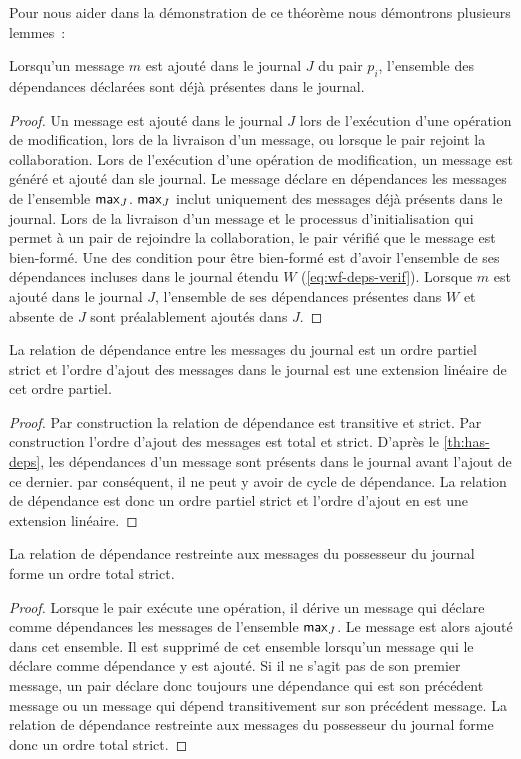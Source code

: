 Pour nous aider dans la démonstration de ce théorème nous démontrons plusieurs lemmes~:

\begin{lemma}\label{th:has-deps}
Lorsqu'un message $m$ est ajouté dans le journal $J$ du pair $p_i$, l'ensemble des dépendances déclarées sont déjà présentes dans le journal.
\end{lemma} 
\begin{proof}
Un message est ajouté dans le journal $J$ lors de l'exécution d'une opération de modification, lors de la livraison d'un message, ou lorsque le pair rejoint la collaboration.
Lors de l'exécution d'une opération de modification, un message est généré et ajouté dan sle journal.
Le message déclare en dépendances les messages de l'ensemble $\operatorname{\mathsf{max}}_J$.
$\operatorname{\mathsf{max}}_J$ inclut uniquement des messages déjà présents dans le journal.
Lors de la livraison d'un message et le processus d'initialisation qui permet à un pair de rejoindre la collaboration, le pair vérifié que le message est bien-formé.
Une des condition pour être bien-formé est d'avoir l'ensemble de ses dépendances incluses dans le journal étendu $W$ (\autoref{eq:wf-deps-verif}).
Lorsque $m$ est ajouté dans le journal $J$, l'ensemble de ses dépendances présentes dans $W$ et absente de $J$ sont préalablement ajoutés dans $J$.
\end{proof}

\begin{lemma}
La relation de dépendance entre les messages du journal est un ordre partiel strict et l'ordre d'ajout des messages dans le journal est une extension linéaire de cet ordre partiel.
\end{lemma}
\begin{proof}
Par construction la relation de dépendance est transitive et strict.
Par construction l'ordre d'ajout des messages est total et strict.
D'après le \autoref{th:has-deps}, les dépendances d'un message sont présents dans le journal avant l'ajout de ce dernier.
par conséquent, il ne peut y avoir de cycle de dépendance.
La relation de dépendance est donc un ordre partiel strict et l'ordre d'ajout en est une extension linéaire.
\end{proof}

\begin{lemma}\label{th:total-dep-owner}
La relation de dépendance restreinte aux messages du possesseur du journal forme un ordre total strict.
\end{lemma}
\begin{proof}
Lorsque le pair exécute une opération, il dérive un message qui déclare comme dépendances les messages de l'ensemble $\operatorname{\mathsf{max}}_J$.
Le message est alors ajouté dans cet ensemble.
Il est supprimé de cet ensemble lorsqu'un message qui le déclare comme dépendance y est ajouté.
Si il ne s'agit pas de son premier message, un pair déclare donc toujours une dépendance qui est son précédent message ou un message qui dépend transitivement sur son précédent message.
La relation de dépendance restreinte aux messages du possesseur du journal forme donc un ordre total strict.
\end{proof}

